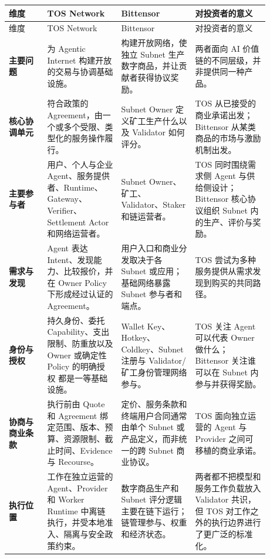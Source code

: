 \documentclass[UTF8,11pt,fontset=fandol]{ctexart}
\begin{document}
\begin{landscape}
\footnotesize
\begin{longtable}{P{0.13\linewidth}P{0.25\linewidth}P{0.25\linewidth}P{0.25\linewidth}}
\toprule
{}
维度 & TOS Network & Bittensor & 对投资者的意义 \\
\midrule
\endfirsthead
\toprule
{}
维度 & TOS Network & Bittensor & 对投资者的意义 \\
\midrule
\endhead
\textbf{主要问题} &
为 Agentic Internet 构建开放的交易与协调基础设施。 &
构建开放网络，使独立 Subnet 生产数字商品，并让贡献者获得协议奖励。 &
两者面向 AI 价值链的不同层级，并非提供同一种产品。 \\
\textbf{核心协调单元} &
符合政策的 Agreement，由一个或多个受限、类型化的服务操作履行。 &
Subnet Owner 定义矿工生产什么以及 Validator 如何评分。 &
TOS 从已接受的商业承诺出发；Bittensor 从某类商品的市场与激励机制出发。 \\
\textbf{主要参与者} &
用户、个人与企业 Agent、服务提供者、Runtime、Gateway、Verifier、Settlement Actor
和网络运营者。 &
Subnet Owner、矿工、Validator、Staker 和链运营者。 &
TOS 同时围绕需求侧 Agent 与供给侧设计；Bittensor 核心协议组织 Subnet 内的生产、评价与奖励。 \\
\textbf{需求与发现} &
Agent 表达 Intent、发现能力、比较报价，并在 Owner Policy 下形成经过认证的 Agreement。 &
用户入口和商业分发取决于各 Subnet 或应用；基础网络暴露 Subnet 参与者和端点。 &
TOS 尝试为多种服务提供从需求发现到购买的共同路径。 \\
\textbf{身份与授权} &
持久身份、委托 Capability、支出限制、防重放以及 Owner 或确定性 Policy 的明确授权
都是一等基础设施。 &
Wallet Key、Hotkey、Coldkey、Subnet 注册与 Validator/矿工身份管理网络参与。 &
TOS 关注 Agent 可以代表 Owner 做什么；Bittensor 关注谁可以在 Subnet 内参与并获得奖励。 \\
\textbf{协商与商业条款} &
执行前由 Quote 和 Agreement 绑定范围、版本、预算、资源限制、截止时间、Evidence 与 Recourse。 &
定价、服务条款和终端用户合同通常由单个 Subnet 或产品定义，而非统一的跨 Subnet 商业协议。 &
TOS 面向独立运营的 Agent 与 Provider 之间可移植的商业承诺。 \\
\textbf{执行位置} &
工作在独立运营的 Agent、Provider 和 Worker Runtime 中离链执行，并受本地准入、隔离与安全政策约束。 &
数字商品生产和 Subnet 评分逻辑主要在链下运行；链管理参与、权重和经济状态。 &
两者都不把模型和服务工作负载放入 Validator 共识，但 TOS 对工作之外的执行边界进行了更广泛的标准化。 \\

\end{longtable}
\end{landscape}
\end{document}
